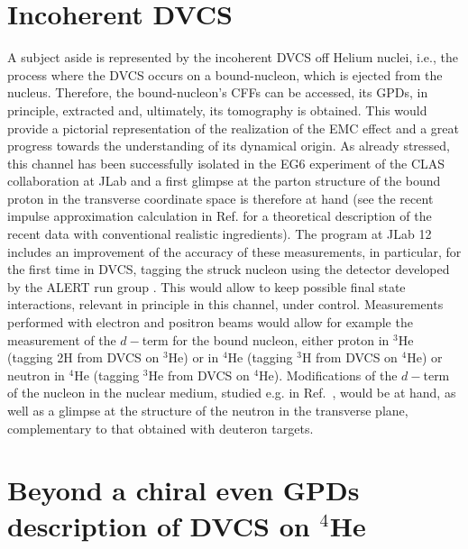 \documentclass[times, twoside]{PosWhiPap}
\begin{document}
\section*{Incoherent DVCS}
{ A subject aside is represented by the incoherent DVCS off Helium nuclei, 
i.e., the process where the DVCS occurs on a bound-nucleon, which is ejected 
from the nucleus. Therefore, the bound-nucleon's CFFs can be accessed, its 
GPDs, in principle, extracted and, ultimately, its tomography is obtained.
This would provide a pictorial representation of the realization of the EMC 
effect and a great progress towards the understanding of its dynamical origin.
As already stressed, this channel has been successfully isolated in the EG6 
experiment of the CLAS collaboration at JLab \cite{Hattawy:2018liu} and a first 
glimpse at the parton structure of the bound proton in the transverse 
coordinate space is therefore at hand (see the recent impulse approximation 
calculation in Ref. \cite{Fucini:2019xlc} for a theoretical description
of the recent data with conventional realistic ingredients).
The program at JLab 12 includes an improvement of the accuracy of these 
measurements, in particular, for the first time in DVCS, tagging the struck 
nucleon using the detector developed by the ALERT run group 
\cite{Armstrong:2017zcm}. This would allow to keep possible final state 
interactions, relevant in principle in this channel, under control.
Measurements performed with electron and positron beams  would allow for 
example the measurement of the $d-$term for the bound nucleon, either proton in 
$^3$He (tagging 2H from DVCS on $^3$He)  or in $^4$He (tagging $^3$H from DVCS 
on $^4$He) or neutron in $^4$He (tagging $^3$He from DVCS on $^4$He).  
Modifications of the $d-$term of the nucleon in the nuclear medium, studied 
e.g. in Ref.~\cite{Jung:2014jja}, would be at hand, as well as a glimpse at the 
structure of the neutron in the transverse plane, complementary to that 
obtained with deuteron targets.}

\section*{Beyond a chiral even GPDs description of DVCS on $^4$He}
\end{document}
